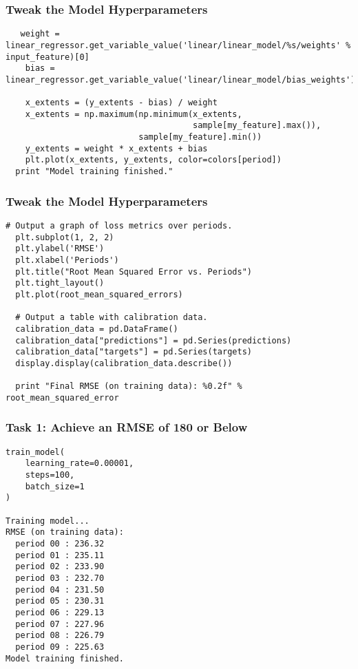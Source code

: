 \begin{frame}[fragile]\frametitle{Tweak the Model Hyperparameters}
\begin{lstlisting}
   weight = linear_regressor.get_variable_value('linear/linear_model/%s/weights' % input_feature)[0]
    bias = linear_regressor.get_variable_value('linear/linear_model/bias_weights')

    x_extents = (y_extents - bias) / weight
    x_extents = np.maximum(np.minimum(x_extents,
                                      sample[my_feature].max()),
                           sample[my_feature].min())
    y_extents = weight * x_extents + bias
    plt.plot(x_extents, y_extents, color=colors[period]) 
  print "Model training finished."
\end{lstlisting}
\end{frame}

\begin{frame}[fragile]\frametitle{Tweak the Model Hyperparameters}
\begin{lstlisting}
# Output a graph of loss metrics over periods.
  plt.subplot(1, 2, 2)
  plt.ylabel('RMSE')
  plt.xlabel('Periods')
  plt.title("Root Mean Squared Error vs. Periods")
  plt.tight_layout()
  plt.plot(root_mean_squared_errors)

  # Output a table with calibration data.
  calibration_data = pd.DataFrame()
  calibration_data["predictions"] = pd.Series(predictions)
  calibration_data["targets"] = pd.Series(targets)
  display.display(calibration_data.describe())

  print "Final RMSE (on training data): %0.2f" % root_mean_squared_error
\end{lstlisting}
\end{frame}

\begin{frame}[fragile]\frametitle{Task 1: Achieve an RMSE of 180 or Below}
\begin{lstlisting}
train_model(
    learning_rate=0.00001,
    steps=100,
    batch_size=1
)

Training model...
RMSE (on training data):
  period 00 : 236.32
  period 01 : 235.11
  period 02 : 233.90
  period 03 : 232.70
  period 04 : 231.50
  period 05 : 230.31
  period 06 : 229.13
  period 07 : 227.96
  period 08 : 226.79
  period 09 : 225.63
Model training finished.
\end{lstlisting}

\end{frame}



